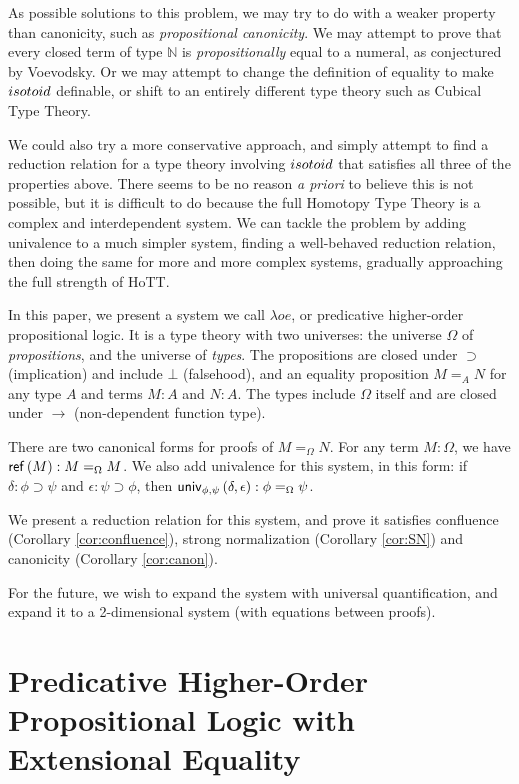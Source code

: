 As possible solutions to this problem, we may try to do with a weaker property than canonicity, such as \emph{propositional canonicity}.
We may attempt to prove that every closed term of type $\mathbb{N}$ is \emph{propositionally} equal to a numeral, as conjectured by Voevodsky.  Or we may attempt to change the definition of equality to make $isotoid$ definable\cite{Polonsky14a}, or
shift to an entirely different type theory such as Cubical Type Theory\cite{cchm:cubical}.

We could also try a more conservative approach, and simply attempt to find a reduction relation for a type theory involving $isotoid$ that satisfies
all three of the properties above.  There seems to be no reason \emph{a priori} to believe this is not possible, but it is difficult to do because
the full Homotopy Type Theory is a complex and interdependent system.  We can tackle the problem by adding univalence to a much simpler system, finding
a well-behaved reduction relation, then doing the same for more and more complex systems, gradually approaching the full strength of HoTT.

In this paper, we present a system we call $\lambda o e$, or predicative higher-order propositional logic.  It is a type theory with two universes: the universe $\Omega$
of \emph{propositions}, and the universe of \emph{types}.  The propositions are closed under $\supset$ (implication) and include $\bot$ (falsehood), and an equality proposition $M =_A N$ for
any type $A$ and terms $M : A$ and $N : A$.  The types include $\Omega$ itself and are closed under $\rightarrow$ (non-dependent function type).

There are two canonical forms for proofs of $M =_\Omega N$.  For any term $M : \Omega$, we have $\mathsf{ref} \left( {M} \right) : M =_\Omega M$.  We also add univalence for this system, in this form:
if $\delta : \phi \supset \psi$ and $\epsilon : \psi \supset\phi$, then $\mathsf{univ}_{{\phi} , {\psi}} \left( {\delta} , {\epsilon} \right) : \phi =_\Omega \psi$.  

We present a reduction relation for this system, and prove it satisfies confluence (Corollary \ref{cor:confluence}), strong normalization (Corollary \ref{cor:SN}) and canonicity (Corollary \ref{cor:canon}).

For the future, we wish to expand the system with universal quantification, and expand it to a 2-dimensional system (with equations between proofs).


\section{Predicative Higher-Order Propositional Logic with Extensional Equality}

